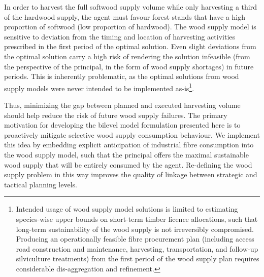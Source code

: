 In order to harvest the full softwood supply volume while only harvesting a third of the hardwood supply, the agent must favour forest stands that have a high proportion of softwood (low proportion of hardwood).
The wood supply model is sensitive to deviation from the timing and location of harvesting activities prescribed in the first period of the optimal solution.
Even slight deviations from the optimal solution carry a high risk of rendering the solution infeasible (from the perspective of the principal, in the form of wood supply shortages) in future periods.   
This is inherently problematic, as the optimal solutions from wood supply models were never intended to be implemented as-is\footnote{Intended usage of wood supply model solutions is limited to estimating species-wise upper bounds on short-term timber licence allocations, such that long-term sustainability of the wood supply is not irreversibly compromised.
Producing an operationally feasible fibre procurement plan (including access road construction and maintenance, harvesting, transportation, and follow-up silviculture treatments) from the first period of the wood supply plan requires considerable dis-aggregation and refinement.}.


Thus, minimizing the gap between planned and executed harvesting volume should help reduce the risk of future wood supply failures.
The primary motivation for developing the bilevel model formulation presented here is to proactively mitigate selective wood supply consumption behaviour. 
We implement this idea by embedding explicit anticipation of industrial fibre consumption into the wood supply model, such that the principal offers the maximal sustainable wood supply that will be entirely consumed by the agent. 
Re-defining the wood supply problem in this way improves the quality of linkage between strategic and tactical planning levels.



